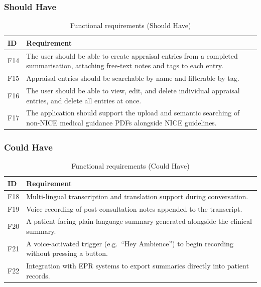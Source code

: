 \subsubsection{Should Have}

\begin{table}[H]
\centering
\begin{tabularx}{\textwidth}{l X}
\toprule
\textbf{ID} & \textbf{Requirement} \\
\midrule
F14 & The user should be able to create appraisal entries from a completed summarisation, attaching free-text notes and tags to each entry. \\
F15 & Appraisal entries should be searchable by name and filterable by tag. \\
F16 & The user should be able to view, edit, and delete individual appraisal entries, and delete all entries at once. \\
F17 & The application should support the upload and semantic searching of non-NICE medical guidance PDFs alongside NICE guidelines. \\
\bottomrule
\end{tabularx}
\caption{Functional requirements (Should Have)}
\label{tab:fsreq}
\end{table}

\subsubsection{Could Have}

\begin{table}[H]
\centering
\begin{tabularx}{\textwidth}{l X}
\toprule
\textbf{ID} & \textbf{Requirement} \\
\midrule
F18 & Multi-lingual transcription and translation support during conversation. \\
F19 & Voice recording of post-consultation notes appended to the transcript. \\
F20 & A patient-facing plain-language summary generated alongside the clinical summary. \\
F21 & A voice-activated trigger (e.g.\ ``Hey Ambience'') to begin recording without pressing a button. \\
F22 & Integration with EPR systems to export summaries directly into patient records. \\
\bottomrule
\end{tabularx}
\caption{Functional requirements (Could Have)}
\label{tab:fcreq}
\end{table}

